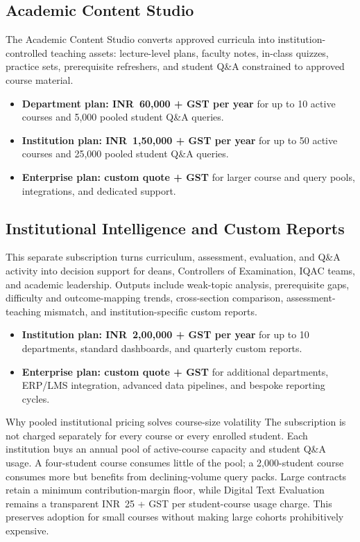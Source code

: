 \documentclass[11pt,a4paper]{article}
\newcommand{\rs}{INR}
\begin{document}
\subsection{Academic Content Studio}

The Academic Content Studio converts approved curricula into institution-controlled teaching assets: lecture-level plans, faculty notes, in-class quizzes, practice sets, prerequisite refreshers, and student Q\&A constrained to approved course material.

\begin{itemize}
  \item \textbf{Department plan: \rs\ 60,000 + GST per year} for up to 10 active courses and 5,000 pooled student Q\&A queries.
  \item \textbf{Institution plan: \rs\ 1,50,000 + GST per year} for up to 50 active courses and 25,000 pooled student Q\&A queries.
  \item \textbf{Enterprise plan: custom quote + GST} for larger course and query pools, integrations, and dedicated support.
\end{itemize}

\subsection{Institutional Intelligence and Custom Reports}

This separate subscription turns curriculum, assessment, evaluation, and Q\&A activity into decision support for deans, Controllers of Examination, IQAC teams, and academic leadership. Outputs include weak-topic analysis, prerequisite gaps, difficulty and outcome-mapping trends, cross-section comparison, assessment-teaching mismatch, and institution-specific custom reports.

\begin{itemize}
  \item \textbf{Institution plan: \rs\ 2,00,000 + GST per year} for up to 10 departments, standard dashboards, and quarterly custom reports.
  \item \textbf{Enterprise plan: custom quote + GST} for additional departments, ERP/LMS integration, advanced data pipelines, and bespoke reporting cycles.
\end{itemize}

\begin{greenbox}{Why pooled institutional pricing solves course-size volatility}
The subscription is not charged separately for every course or every enrolled student. Each institution buys an annual pool of active-course capacity and student Q\&A usage. A four-student course consumes little of the pool; a 2,000-student course consumes more but benefits from declining-volume query packs. Large contracts retain a minimum contribution-margin floor, while Digital Text Evaluation remains a transparent \rs\ 25 + GST per student-course usage charge. This preserves adoption for small courses without making large cohorts prohibitively expensive.
\end{greenbox}
\end{document}
